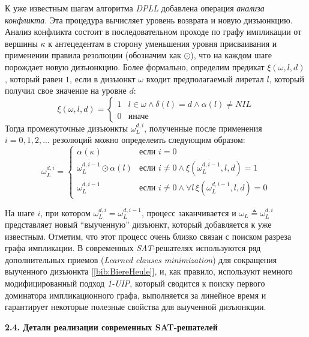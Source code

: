 К уже известным шагам алгоритма \textit{DPLL} добавлена операция \textit{анализа конфликта}. 
Эта процедура вычисляет уровень возврата и новую дизъюнкцию. Анализ конфликта состоит в последовательном проходе по графу импликации от вершины $\kappa$ к антецедентам в сторону уменьшения уровня присваивания и применении правила резолюции (обозначим как $\odot$), что на каждом шаге порождает новую дизъюнкцию. Более формально, определим предикат $\xi(\omega, l, d)$, который равен $1$, если в дизъюнкт $\omega$ входит предполагаемый лиретал $l$, который получил свое значение на уровне $d$:
\begin{equation*}
\xi(\omega, l, d) = 
\begin{cases}
1 & l \in \omega \land \delta(l) = d \land \alpha(l) \ne NIL \\
0 & \text{иначе}
\end{cases}
\end{equation*}
Тогда промежуточные дизъюнкты $\omega_{L}^{d,i}$, полученные после применения $i=0,1,2,...$ резолюций можно определеить следующим образом:
\begin{equation*}
\omega_{L}^{d,i} = 
\begin{cases}
\alpha(\kappa) & \text{если } i = 0 \\
\omega_{L}^{d,i-1} \odot \alpha(l) & \text{если } i \ne 0 \land \xi(\omega_{L}^{d,i-1}, l, d) = 1 \\
\omega_{L}^{d,i-1} & \text{если } i \ne 0 \land \forall l \, \xi(\omega_{L}^{d,i-1}, l, d) = 0
\end{cases}
\end{equation*}

На шаге $i$, при котором $\omega_{L}^{d,i} = \omega_{L}^{d,i-1}$, процесс заканчивается и $\omega_{L} \triangleq \omega_{L}^{d,i}$ представляет новый \enquote{выученную} дизъюнкт, который добавляется к уже известным.
Отметим, что этот процесс очень близко связан с поиском разреза графа импликации. В современных \textit{SAT}-решателях используются ряд дополнительных приемов (\textit{Learned clauses minimization}) для сокращения выученного дизъюнкта [\ref{bib:BiereHeule}], и, как правило, используют немного модифицированный подход \textit{1-UIP}, который сводится к поиску первого доминатора импликационного графа, выполняется за линейное время и гарантирует некоторые полезные свойства для выученной дизъюнкции.

\vspace{5pt}
\textbf{2.4. Детали реализации современных SAT-решателей}\label{chapters:2.4}
\vspace{5pt}

